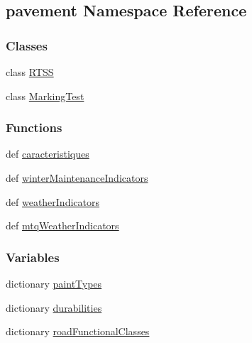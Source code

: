 \hypertarget{namespacepavement}{\subsection{pavement Namespace Reference}
\label{namespacepavement}
}
\subsubsection*{Classes}
\begin{DoxyCompactItemize}
\item 
class \hyperlink{classpavement_1_1RTSS}{R\-T\-S\-S}
\item 
class \hyperlink{classpavement_1_1MarkingTest}{Marking\-Test}
\end{DoxyCompactItemize}
\subsubsection*{Functions}
\begin{DoxyCompactItemize}
\item 
def \hyperlink{namespacepavement_a5bfe062d81eca924b02aa00cfd1fe713}{caracteristiques}
\item 
def \hyperlink{namespacepavement_a348ef6d294c001b93ca50d5fd855cc36}{winter\-Maintenance\-Indicators}
\item 
def \hyperlink{namespacepavement_a0c0056df4158ede709a3ff3c7a78cc36}{weather\-Indicators}
\item 
def \hyperlink{namespacepavement_a0041d9ab67b10827363774773fff5a72}{mtq\-Weather\-Indicators}
\end{DoxyCompactItemize}
\subsubsection*{Variables}
\begin{DoxyCompactItemize}
\item 
dictionary \hyperlink{namespacepavement_a40fec2a77d81ff59109d289c0732b0b7}{paint\-Types}
\item 
dictionary \hyperlink{namespacepavement_ac47a6ee1509d65ecfb77d39489de0bf7}{durabilities}
\item 
dictionary \hyperlink{namespacepavement_ae58e78f8342ea7dd1a715bad1f40e142}{road\-Functional\-Classes}
\end{DoxyCompactItemize}


